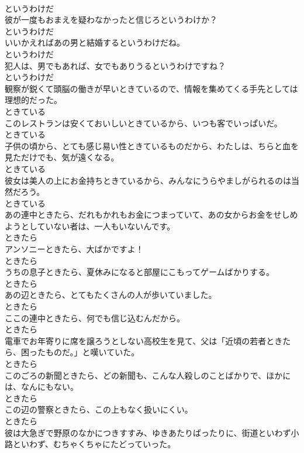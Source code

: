 \documentclass[8pt]{extreport}
\begin{document}
\begin{CJK}{UTF8}{min}
\\	というわけだ
\\	彼が一度もおまえを疑わなかったと信じろというわけか？	
\\	というわけだ
\\	いいかえればあの男と結婚するというわけだね。	
\\	というわけだ
\\	犯人は、男でもあれば、女でもありうるというわけですね？	
\\	というわけだ
\\	観察が鋭くて頭脳の働きが早いときているので、情報を集めてくる手先としては理想的だった。	
\\	ときている
\\	このレストランは安くておいしいときているから、いつも客でいっぱいだ。	
\\	ときている
\\	子供の頃から、とても感じ易い性ときているものだから、わたしは、ちらと血を見ただけでも、気が遠くなる。	
\\	ときている
\\	彼女は美人の上にお金持ちときているから、みんなにうらやましがられるのは当然だろう。	
\\	ときている
\\	あの連中ときたら、だれもかれもお金につまっていて、あの女からお金をせしめようとしていない者は、一人もいないんです。	
\\	ときたら
\\	アンソニーときたら、大ばかですよ！	
\\	ときたら
\\	うちの息子ときたら、夏休みになると部屋にこもってゲームばかりする。	
\\	ときたら
\\	あの辺ときたら、とてもたくさんの人が歩いていました。	
\\	ときたら
\\	ここの連中ときたら、何でも信じ込むんだから。	
\\	ときたら
\\	電車でお年寄りに席を譲ろうとしない高校生を見て、父は「近頃の若者ときたら、困ったものだ。」と嘆いていた。	
\\	ときたら
\\	このごろの新聞ときたら、どの新聞も、こんな人殺しのことばかりで、ほかには、なんにもない。	
\\	ときたら
\\	この辺の警察ときたら、この上もなく扱いにくい。	
\\	ときたら
\\	彼は大急ぎで野原のなかにつきすすみ、ゆきあたりばったりに、街道といわず小路といわず、むちゃくちゃにたどっていった。	

\end{CJK}
\end{document}
